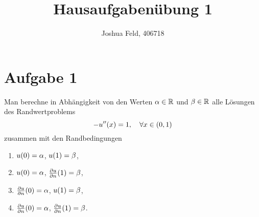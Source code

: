 \documentclass{exercise}
\institute{Applied and Computational Mathematics}
\title{Hausaufgabenübung 1}
\author{Joshua Feld, 406718}
\begin{document}
    \maketitle


    \section*{Aufgabe 1}

    \begin{problem}
        Man berechne in Abhängigkeit von den Werten \(\alpha \in \mathbb{R}\) und \(\beta \in \mathbb{R}\) alle Lösungen des Randwertproblems
        \[
            -u''\parentheses*{x} = 1, \quad \forall x \in \parentheses*{0, 1}
        \]
        zusammen mit den Randbedingungen
        \begin{enumerate}
            \item \(u\parentheses*{0} = \alpha\), \(u\parentheses*{1} = \beta\),
            \item \(u\parentheses*{0} = \alpha\), \(\frac{\partial u}{\partial n}\parentheses*{1} = \beta\),
            \item \(\frac{\partial u}{\partial n}\parentheses*{0} = \alpha\), \(u\parentheses*{1} = \beta\),
            \item \(\frac{\partial u}{\partial n}\parentheses*{0} = \alpha\), \(\frac{\partial u}{\partial n}\parentheses*{1} = \beta\).
        \end{enumerate}
    \end{problem}
\end{document}
